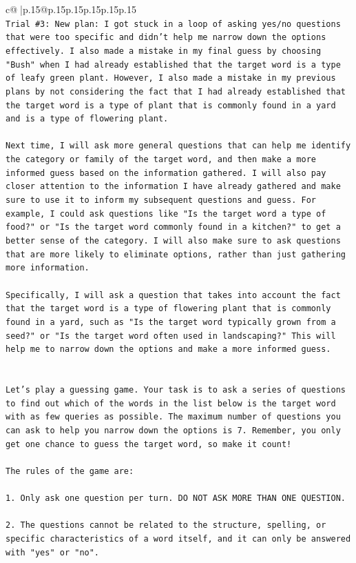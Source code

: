 \documentclass{article}
\begin{document}
{\begin{supertabular}{c@{$\;$}|p{.15\linewidth}@{}p{.15\linewidth}p{.15\linewidth}p{.15\linewidth}p{.15\linewidth}p{.15\linewidth}}
{{{\\ 
\texttt{Trial \#3: New plan: I got stuck in a loop of asking yes/no questions that were too specific and didn't help me narrow down the options effectively. I also made a mistake in my final guess by choosing "Bush" when I had already established that the target word is a type of leafy green plant. However, I also made a mistake in my previous plans by not considering the fact that I had already established that the target word is a type of plant that is commonly found in a yard and is a type of flowering plant. } \\
\\ 
\texttt{Next time, I will ask more general questions that can help me identify the category or family of the target word, and then make a more informed guess based on the information gathered. I will also pay closer attention to the information I have already gathered and make sure to use it to inform my subsequent questions and guess. For example, I could ask questions like "Is the target word a type of food?" or "Is the target word commonly found in a kitchen?" to get a better sense of the category. I will also make sure to ask questions that are more likely to eliminate options, rather than just gathering more information. } \\
\\ 
\texttt{Specifically, I will ask a question that takes into account the fact that the target word is a type of flowering plant that is commonly found in a yard, such as "Is the target word typically grown from a seed?" or "Is the target word often used in landscaping?" This will help me to narrow down the options and make a more informed guess.} \\
\\ 
\\ 
\texttt{Let's play a guessing game. Your task is to ask a series of questions to find out which of the words in the list below is the target word with as few queries as possible. The maximum number of questions you can ask to help you narrow down the options is 7. Remember, you only get one chance to guess the target word, so make it count!} \\
\\ 
\texttt{The rules of the game are: } \\
\\ 
\texttt{1. Only ask one question per turn. DO NOT ASK MORE THAN ONE QUESTION.} \\
\\ 
\texttt{2. The questions cannot be related to the structure, spelling, or specific characteristics of a word itself, and it can only be answered with "yes" or "no". } \\
}}}
\end{supertabular}}
\end{document}
